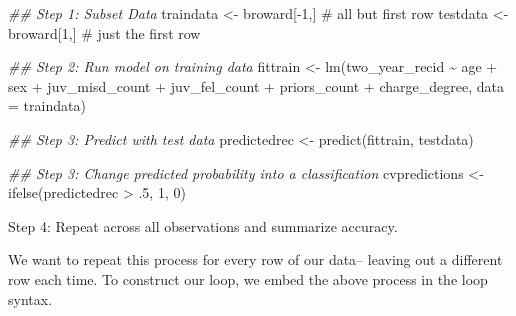 \documentclass[
  letterpaper,
  DIV=11,
  numbers=noendperiod]{scrreprt}
\newenvironment{Shaded}{\begin{snugshade}}{\end{snugshade}}
\newcommand{\AttributeTok}[1]{\textcolor[rgb]{0.40,0.45,0.13}{#1}}
\newcommand{\CommentTok}[1]{\textcolor[rgb]{0.37,0.37,0.37}{#1}}
\newcommand{\DecValTok}[1]{\textcolor[rgb]{0.68,0.00,0.00}{#1}}
\newcommand{\DocumentationTok}[1]{\textcolor[rgb]{0.37,0.37,0.37}{\textit{#1}}}
\newcommand{\FunctionTok}[1]{\textcolor[rgb]{0.28,0.35,0.67}{#1}}
\newcommand{\NormalTok}[1]{\textcolor[rgb]{0.00,0.23,0.31}{#1}}
\newcommand{\OtherTok}[1]{\textcolor[rgb]{0.00,0.23,0.31}{#1}}
\newcommand{\SpecialCharTok}[1]{\textcolor[rgb]{0.37,0.37,0.37}{#1}}
\begin{document}
\begin{Shaded}
\begin{Highlighting}[]
\DocumentationTok{\#\# Step 1: Subset Data}
\NormalTok{traindata }\OtherTok{\textless{}{-}}\NormalTok{ broward[}\SpecialCharTok{{-}}\DecValTok{1}\NormalTok{,] }\CommentTok{\# all but first row}
\NormalTok{testdata }\OtherTok{\textless{}{-}}\NormalTok{ broward[}\DecValTok{1}\NormalTok{,] }\CommentTok{\# just the first row}

\DocumentationTok{\#\# Step 2: Run model on training data}
\NormalTok{fittrain }\OtherTok{\textless{}{-}} \FunctionTok{lm}\NormalTok{(two\_year\_recid }\SpecialCharTok{\textasciitilde{}}\NormalTok{ age }\SpecialCharTok{+}\NormalTok{ sex }\SpecialCharTok{+}\NormalTok{ juv\_misd\_count }
               \SpecialCharTok{+}\NormalTok{ juv\_fel\_count }\SpecialCharTok{+} 
\NormalTok{            priors\_count }\SpecialCharTok{+}\NormalTok{ charge\_degree, }
          \AttributeTok{data =}\NormalTok{ traindata)}

\DocumentationTok{\#\# Step 3: Predict with test data}
\NormalTok{predictedrec }\OtherTok{\textless{}{-}} \FunctionTok{predict}\NormalTok{(fittrain, testdata)}

\DocumentationTok{\#\# Step 3: Change predicted probability into a classification}
\NormalTok{cvpredictions }\OtherTok{\textless{}{-}} \FunctionTok{ifelse}\NormalTok{(predictedrec }\SpecialCharTok{\textgreater{}}\NormalTok{ .}\DecValTok{5}\NormalTok{, }\DecValTok{1}\NormalTok{, }\DecValTok{0}\NormalTok{)}
\end{Highlighting}
\end{Shaded}

Step 4: Repeat across all observations and summarize accuracy.

We want to repeat this process for every row of our data-- leaving out a
different row each time. To construct our loop, we embed the above
process in the loop syntax.
\end{document}
